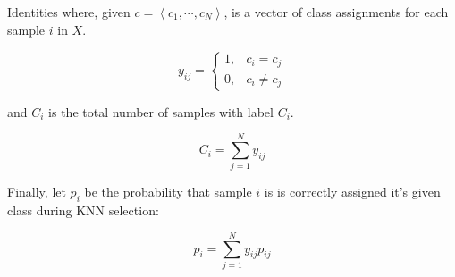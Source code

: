 \documentclass[12pt, a4paper]{article}
\begin{document}
\begin{section}{Identities}
    where, given $c = \left <c_1, \cdots, c_N \right >$, is a vector of class
    assignments for each sample $i$ in $X$.

    \begin{equation}
        y_{ij} =
               \begin{cases*}
                   1, & c_i = c_j \\
                   0, & c_i \neq c_j
               \end{cases*}
    \end{equation}

    and $C_i$ is the total number of samples with label $C_i$.

    \begin{equation}
        C_i = \sum \limits_{j = 1}^N y_{ij}
    \end{equation}

    Finally, let $p_i$ be the probability that sample $i$ is is correctly
    assigned it's given class during KNN selection:

    \begin{equation}
        p_i = \sum \limits_{j=1}^N y_{ij} p_{ij}
    \end{equation}

\end{section}
\end{document}
